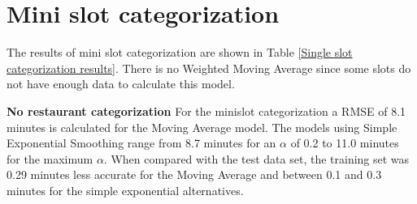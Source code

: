 \section{Mini slot categorization}\label{section:Single slot categorization}
The results of mini slot categorization are shown in Table \ref{Single slot categorization results}. There is no Weighted Moving Average since some slots do not have enough data to calculate this model.
\begin{table}[h]
\centering
\caption{Mini slot categorization results}
\label{Single slot categorization results}
\end{table}
\newline\newline\textbf{No restaurant categorization}\newline
For the minislot categorization a RMSE of 8.1 minutes is calculated for the Moving Average model. The models using Simple Exponential Smoothing range from 8.7 minutes for an $\alpha$ of 0.2 to 11.0 minutes for the maximum $\alpha$. When compared with the test data set, the training set was 0.29 minutes less accurate for the Moving Average and between 0.1 and 0.3 minutes for the simple exponential alternatives.\newline
